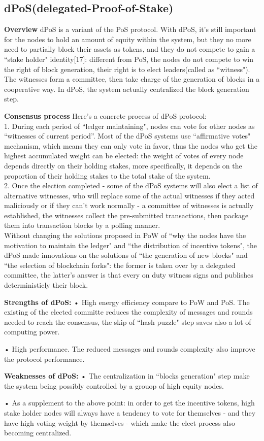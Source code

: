 \documentclass[doublespacing]{bmcart}
\begin{document}
\begin{CJK*}{UTF8}{gbsn}
\subsection{\textbf{dPoS(delegated-Proof-of-Stake)}}
\textbf{Overview}	
dPoS is a variant of the PoS protocol. With dPoS, it's still important for the nodes to hold an amount of equity within the system, but they no more need to partially block their assets as tokens, and they do not compete to gain a ``stake holder" identity[17]: different from PoS, the nodes do not compete to win the right of block generation, their right is to elect leaders(called as ``witness"). The witnesses form a committee, then take charge of the generation of blocks in a cooperative way. In dPoS, the system actually centralized the block generation step.
 \par \textbf{Consensus process}
Here's a concrete process of dPoS protocol:
\\1. During each period of ``ledger maintaining", nodes can vote for other nodes as “witnesses of current period”. Most of the dPoS systems use ``affirmative votes" mechanism, which means they can only vote in favor, thus the nodes who get the highest accumulated weight can be elected: the weight of votes of every node depends directly on their holding stakes, more specifically, it depends on the proportion of their holding stakes to the total stake of the system.
\\2. Once the election completed - some of the dPoS systems will also elect a list of alternative witnesses, who will replace some of the actual witnesses if they acted maliciously or if they can't work normally - a committee of witnesses is actually established, the witnesses collect the pre-submitted transactions, then package them into transaction blocks by a polling manner.
\\Without changing the solutions proposed in PoW of ``why the nodes have the motivation to maintain the ledger" and ``the distribution of incentive tokens", the dPoS made innovations on the solutions of ``the generation of new blocks" and ``the selection of blockchain forks": the former is taken over by a delegated committee, the latter's answer is that every on duty witness signs and publishes deterministicly their block.
\par \textbf{Strengths of dPoS:}	
• High energy efficiency compare to PoW and PoS. The existing of the elected committe reduces the complexity of messages and rounds needed to reach the consensus, the skip of ``hash puzzle" step saves also a lot of computing power.
\par • High performance. The reduced messages and rounds complexity also improve the protocol performance. 
\par \textbf{Weaknesses of dPoS:}	
• The centralization in ``blocks generation" step make the system being possibly controlled by a grouop of high equity nodes.
\par • As a supplement to the above point: in order to get the incentive tokens, high stake holder nodes will always have a tendency to vote for themselves - and they have high voting weight by themselves - which make the elect process also becoming centralized.
	

\end{CJK*}
\end{document}
